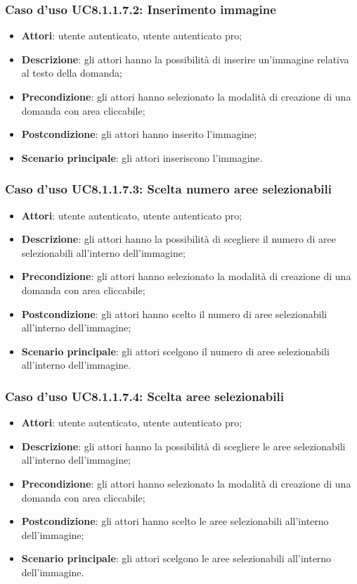 \subsubsection{Caso d'uso UC8.1.1.7.2: Inserimento immagine}
\begin{itemize}
	\item \textbf{Attori}: utente autenticato, utente autenticato pro;
	\item \textbf{Descrizione}: gli attori hanno la possibilità di inserire un'immagine relativa al testo della domanda;
	\item \textbf{Precondizione}: gli attori hanno selezionato la modalità di creazione di una domanda con area cliccabile; 
	\item \textbf{Postcondizione}: gli attori hanno inserito l'immagine;
	\item \textbf{Scenario principale}: gli attori inseriscono l'immagine. 	
\end{itemize}

\subsubsection{Caso d'uso UC8.1.1.7.3: Scelta numero aree selezionabili}
\begin{itemize}
	\item \textbf{Attori}: utente autenticato, utente autenticato pro;
	\item \textbf{Descrizione}: gli attori hanno la possibilità di scegliere il numero di aree selezionabili all'interno dell'immagine;
	\item \textbf{Precondizione}: gli attori hanno selezionato la modalità di creazione di una domanda con area cliccabile; 
	\item \textbf{Postcondizione}: gli attori hanno scelto il numero di aree selezionabili all'interno dell'immagine;
	\item \textbf{Scenario principale}: gli attori scelgono il numero di aree selezionabili all'interno dell'immagine. 	
\end{itemize}

\subsubsection{Caso d'uso UC8.1.1.7.4: Scelta aree selezionabili}
\begin{itemize}
	\item \textbf{Attori}: utente autenticato, utente autenticato pro;
	\item \textbf{Descrizione}: gli attori hanno la possibilità di scegliere le aree selezionabili all'interno dell'immagine;
	\item \textbf{Precondizione}: gli attori hanno selezionato la modalità di creazione di una domanda con area cliccabile; 
	\item \textbf{Postcondizione}: gli attori hanno scelto le aree selezionabili all'interno dell'immagine;
	\item \textbf{Scenario principale}: gli attori scelgono le aree selezionabili all'interno dell'immagine. 	
\end{itemize}

